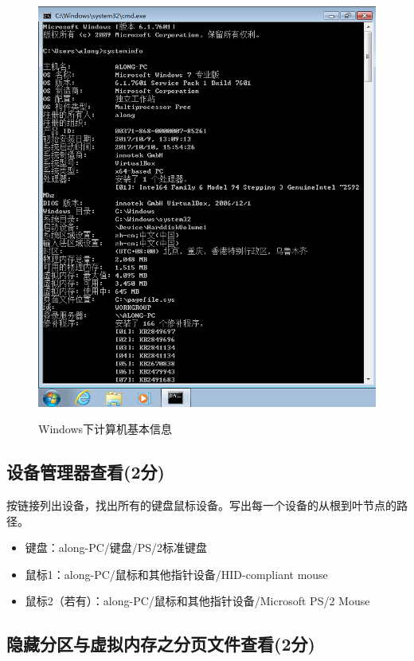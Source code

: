 \begin{figure}[H]
\begin{minipage}[c]{0.3\linewidth}
		\includegraphics[width=\linewidth]{figures/Win-SysInfo}
		\label{fig:win-sysinfo}
	\end{minipage}
	\caption{Windows下计算机基本信息}
\end{figure}

\subsection{设备管理器查看(2分)}
按链接列出设备，找出所有的键盘鼠标设备。写出每一个设备的从根到叶节点的路径。

\begin{itemize}
	\item 键盘：along-PC/键盘/PS/2标准键盘
	\item 鼠标1：along-PC/鼠标和其他指针设备/HID-compliant mouse
	\item 鼠标2（若有）：along-PC/鼠标和其他指针设备/Microsoft PS/2 Mouse
\end{itemize}

\subsection{隐藏分区与虚拟内存之分页文件查看(2分)}

